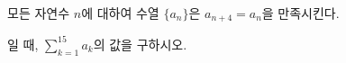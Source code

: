 모든 자연수 $n$에 대하여 수열 $\{a_n\}$은 $a_{n+4}=a_n$을 만족시킨다.\par\smallskip{}\par\smallskip\noindent 일 때, $\displaystyle\sum_{k=1}^{15} a_k$의 값을 구하시오.
